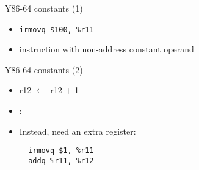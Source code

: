 \begin{frame}[label=Y86immed1,fragile]{Y86-64 constants (1)}
\begin{itemize}
\item \lstinline|irmovq $100, %r11|
\item {} instruction with non-address constant operand
\end{itemize}
\end{frame}

\begin{frame}[label=Y86immed2,fragile]{Y86-64 constants (2)}
\begin{itemize}
\item r12 $\leftarrow$ r12 + 1
\item {}:  
\item<2->Instead, need an extra register:
\begin{lstlisting}
  irmovq $1, %r11
  addq %r11, %r12
\end{lstlisting}
\end{itemize}
\end{frame}

\begin{comment}
\begin{frame}[label=Y86immed3,fragile]{Y86-64 constants (3)}
\begin{itemize}
\item r12 $\leftarrow$ memory[0x40000]
\item \myemph{Invalid}: \xcancel{\tt \mrmovq 0x40000, \%r12}
\item<2-> Instead:
\begin{lstlisting}
  irmovq $0x40000, %r12
  mrmovq 0(%r12), %r12
\end{lstlisting}
\item<3-> Or:
\begin{lstlisting}
  xor %r12, %r12
  mrmovq 0x40000(%r12), %r12
\end{lstlisting}
\end{itemize}
\end{frame}
\end{comment}



